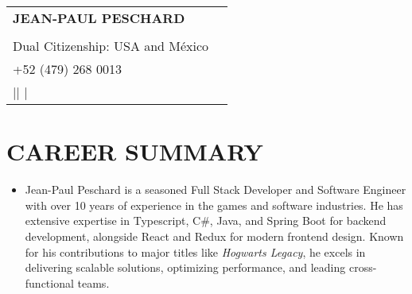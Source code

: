 \documentclass[letterpaper,11pt]{article}
\begin{document}

\begin{tabularx}{\textwidth}{l r}
  \noindent
  \vspace{-20pt} %
{\LARGE \textbf{JEAN-PAUL PESCHARD}} \\[5pt]
\makebox[\textwidth][r]{%
    \begin{tabular}[t]{r}
        \textbf{Full Stack Developer | Software Engineer} \\
        \small{Dual Citizenship: USA and México} \\
        \small{+52 (479) 268 0013} \\ 
        \href{url to portfolio}{\color{blue}{Portfolio}}{|}\href{mailto:jp.peschard@outlook.com}{\color{blue}{jp.peschard@outlook.com}}{|} 
        \href{https://www.linkedin.com/in/jean-paulpeschard/}{\color{blue}{LinkedIn}}{|} \href{https://github.com/JeanPaulPeschard}{\color{blue}{Github}}
    \end{tabular}%
} \\[5pt]
\end{tabularx}
\vspace{-7pt}

\section{\color{airforceblue}CAREER SUMMARY}
\begin{itemize}[leftmargin=0.25in, label={}]
    \item \small{
      \parbox{\linewidth}{
        Jean-Paul Peschard is a seasoned Full Stack Developer and Software Engineer with over 10 years of experience in the games and software industries. He has extensive expertise in Typescript, C\#, Java, and Spring Boot for backend development, alongside React and Redux for modern frontend design. Known for his contributions to major titles like \textit{Hogwarts Legacy}, he excels in delivering scalable solutions, optimizing performance, and leading cross-functional teams.
          }
        }
\end{itemize}
\vspace{-20pt}

\end{document}
